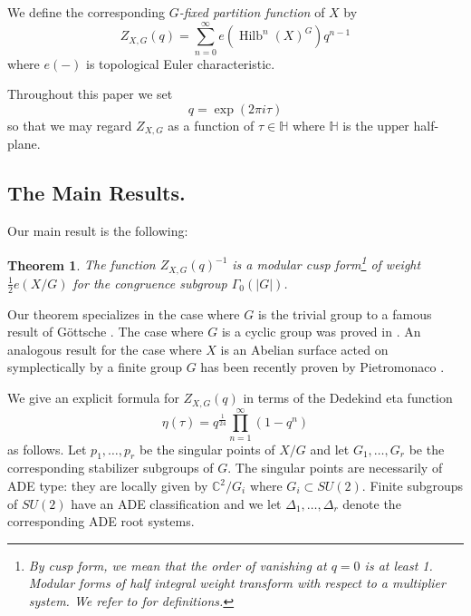 \documentclass{amsart}
\newtheorem{theorem}{Theorem}[section]
\theoremstyle{definition}
\newcommand{\half}{\frac{1}{2}}
\newcommand{\CC} {{\mathbb C}}          %
\newcommand{\HH}{\mathbb{H}}
\newcommand{\Hilb}{\operatorname{Hilb}}
\begin{document}
We define the corresponding \emph{$G$-fixed partition function} of
$X$ by
\[
Z_{X,G}(q) = \sum_{n=0}^{\infty} e\left(\Hilb^{n}(X)^{G} \right) q^{n-1} 
\]
where $e(-)$ is topological Euler characteristic.

Throughout this paper we set
\[
q=\exp\left(2\pi i \tau  \right)
\]
so that we may regard $Z_{X,G}$ as a function of $\tau \in \HH$ where
$\HH$ is the upper half-plane.

\subsection{The Main Results.}
Our main result is the following:

\begin{theorem}
\label{thm:main} The function $Z_{X,G}(q)^{-1}$ is a modular cusp
form\footnote{By cusp form, we mean that the order of vanishing at
$q=0$ is at least 1. Modular forms of half integral weight transform with
respect to a multiplier system. We refer to \cite{kohler2011eta} for
definitions.} of weight $\half e(X/G)$ for the congruence subgroup
$\Gamma_{0}(|G|)$.
\end{theorem}
   

Our theorem specializes in the case where $G$ is the trivial group to
a famous result of G\"ottsche \cite{gottsche1990betti}. The case where
$G$ is a cyclic group was proved in \cite{bryan2018chl}. An analogous
result for the case where $X$ is an Abelian surface acted on
symplectically by a finite group $G$ has been recently proven by
Pietromonaco \cite{Pietromonaco-GHilbA}.


We give an explicit formula for $Z_{X,G}(q)$ in terms of the
Dedekind eta function
\[
\eta (\tau ) = q^{\frac{1}{24}}\prod_{n=1}^{\infty} (1-q^{n})
\]
as follows. Let $p_{1},\dots ,p_{r}$ be the singular points of $X/G$
and let $G_{1},\dots ,G_{r}$ be the corresponding stabilizer subgroups
of $G$. The singular points are necessarily of ADE type: they are
locally given by $\CC^{2}/G_{i}$ where $G_{i}\subset SU(2)$. Finite
subgroups of $SU(2)$ have an ADE classification and we let
$\Delta_{1},\dots ,\Delta_{r}$ denote the corresponding ADE root
systems.
\end{document}
